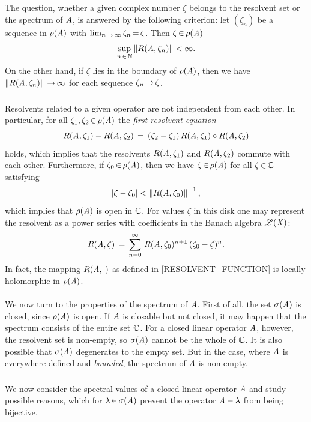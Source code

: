 \documentclass[11pt,twoside]{article}
\begin{document}
\subparagraph*{}
The question,
whether a given complex number $\zeta$ belongs to
the resolvent set or the spectrum of $\mathit{A}$,
is answered by the following criterion:
let $(\zeta_n)$ be a sequence in
$\rho(\mathit{A})$ with $\lim_{n {\,\to\,} \infty} \zeta_n {\,=\,} \zeta$.
Then $\zeta {\,\in\,} \rho(\mathit{A})$ \iff
\[
\sup_{n {\,\in\,} {\mathbb{N}}} \left\lVert R(\mathit{A},\zeta_n) \right\rVert < \infty.
\]
On the other hand,
if $\zeta$ lies in the boundary of $\rho(\mathit{A})$,
then we have $\left\lVert R(\mathit{A},\zeta_n) \right\rVert {\,\to\,} \infty$
for each sequence $\zeta_n {\,\to\,} \zeta$.

\subparagraph*{}
Resolvents related to a given operator are not independent from each other.
In particular,
for all $\zeta_1,\zeta_2 {\,\in\,} \rho(\mathit{A})$
the \textit{first resolvent equation}
\begin{equation}\label{RESOLVENT_EQUATION}
R(\mathit{A},\zeta_1) - R(\mathit{A},\zeta_2)
\,=\,
(\zeta_2-\zeta_1) \, R(\mathit{A},\zeta_1) \circ R(\mathit{A},\zeta_2)
\end{equation}
holds,
which implies that
the resolvents $R(\mathit{A},\zeta_1)$ and $R(\mathit{A},\zeta_2)$ commute with each other.
Furthermore,
if $\zeta_0 {\,\in\,} \rho(\mathit{A})$,
then we have $\zeta {\,\in\,} \rho(\mathit{A})$ for all $\zeta {\,\in\,} {\mathbb{C}}$ satisfying
\[
\abs{\zeta-\zeta_0 } < \norm{R(\linA,\zeta_0)}^{-1},
\]
which implies that $\rho(\mathit{A})$ is open in ${\mathbb{C}}$.
For values $\zeta$ in this disk
one may represent the resolvent as a power series
with coefficients in the Banach algebra $\mathscr{L}(\mathit{X})$:
\[
R(\mathit{A},\zeta) \,=\,
\sum_{n=0}^{\infty} \, R(\mathit{A},\zeta_0)^{n+1} \, (\zeta_0-\zeta)^n.
\]
In fact,
the mapping $R(\mathit{A},\cdot)$ as defined in \eqref{RESOLVENT_FUNCTION}
is locally holomorphic in $\rho(\mathit{A})$.

\paragraph*{}
We now turn to the properties of the spectrum of $\mathit{A}$.
First of all,
the set $\sigma(\mathit{A})$ is closed,
since $\rho(\mathit{A})$  is open.
If $\mathit{A}$ is closable but not closed,
it may happen
that the spectrum consists of the entire set ${\mathbb{C}}$.
For a closed linear operator $\mathit{A}$,
however,
the resolvent set is non-empty,
so $\sigma(\mathit{A})$ cannot be the whole of ${\mathbb{C}}$.
It is also possible that $\sigma(\mathit{A})$ degenerates to the empty set.
But in the case,
where $\mathit{A}$ is everywhere defined and \textit{bounded},
the spectrum of $\mathit{A}$ is non-empty.

\subsubsection*{} %
We now consider the spectral values of a closed linear operator $\mathit{A}$
and study possible reasons,
which for $\lambda {\,\in\,} \sigma(\mathit{A})$
prevent the operator $\mathit{A} - \lambda$ from being bijective.
\end{document}
